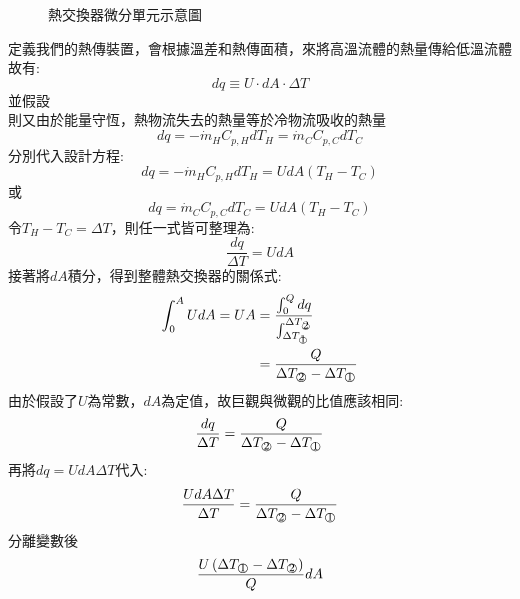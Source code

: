 \documentclass[../main.tex]{subfiles}
\begin{document}
\begin{itemize}
\begin{enumerate}
\begin{figure}[H]
      \caption{熱交換器微分單元示意圖}
    \end{figure}
    定義我們的熱傳裝置，會根據溫差和熱傳面積，來將高溫流體的熱量傳給低溫流體\\
    故有:
    \begin{equation}
      dq \equiv U\cdot dA \cdot \Delta T
    \end{equation}
    並假設\\
    則又由於能量守恆，熱物流失去的熱量等於冷物流吸收的熱量
    \begin{equation}
      dq = -\dot m_H C_{p,H} dT_H = \dot m_C C_{p,C} dT_C
    \end{equation}
    分別代入設計方程:
    \begin{equation}
      dq = -\dot m_H C_{p,H} dT_H = U dA (T_H - T_C)
    \end{equation}
    或
    \begin{equation}
      dq = \dot m_C C_{p,C} dT_C = U dA (T_H - T_C)
    \end{equation}
    令$T_H - T_C = \Delta T$，則任一式皆可整理為:
    \begin{equation}
      \frac{dq}{\Delta T} = U dA
    \end{equation}
    接著將$dA$積分，得到整體熱交換器的關係式:
    \begin{align}
      \int_{0}^{A} U dA = U A &= \frac{\int_0^Q dq}
      {\int_{\Delta T_{\mcirc{\raisebox{-0.5pt}{1}}}}^{\Delta T_{\mcirc{\raisebox{-0.5pt}{2}}}} } \nonumber \\
      &= \frac{Q}{\Delta T_{\mcirc{\raisebox{-0.5pt}{2}}} - \Delta T_{\mcirc{\raisebox{-0.5pt}{1}}}}
    \end{align}
    由於假設了$U$為常數，$dA$為定值，故巨觀與微觀的比值應該相同:
    \begin{equation}
      \frac{dq}{\Delta T} = \frac{Q}{\Delta T_{\mcirc{\raisebox{-0.5pt}{2}}} - \Delta T_{\mcirc{\raisebox{-0.5pt}{1}}}}
    \end{equation}
    再將$dq = U dA \Delta T$代入:
    \begin{equation}
      \frac{U dA \Delta T}{\Delta T} = \frac{Q}{\Delta T_{\mcirc{\raisebox{-0.5pt}{2}}} - \Delta T_{\mcirc{\raisebox{-0.5pt}{1}}}}
    \end{equation}
    分離變數後
    \begin{equation}
    \frac{U\left(\Delta T_{\mcirc{\raisebox{-0.5pt}{1}}} - \Delta T_{\mcirc{\raisebox{-0.5pt}{2}}}\right)}{Q} dA 

\end{equation}
\end{enumerate}
\end{itemize}
\end{document}
